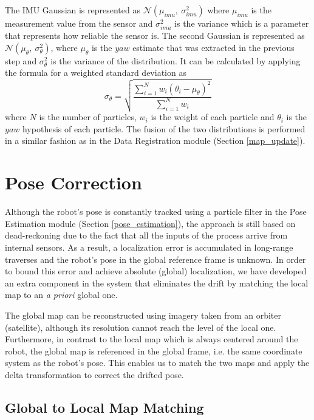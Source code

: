 The IMU Gaussian is represented as $\mathcal{N}(\mu_{imu} ,\ \sigma^2_{imu})$
where $\mu_{imu}$ is the measurement value from the sensor and
$\sigma^2_{imu}$ is the variance which is a parameter that represents how
reliable the sensor is.
The second Gaussian is represented as
$\mathcal{N}(\mu_{\theta} ,\ \sigma^2_{\theta})$,
where $\mu_{\theta}$ is the $yaw$ estimate that was extracted in the
previous step and $\sigma^2_{\theta}$ is the variance of the distribution.
It can be calculated by applying the formula for a weighted standard
deviation as
\begin{equation}
    \sigma_\theta = \sqrt{\frac
    {\sum\limits^{N}_{i=1} w_i (\theta_i - \mu_\theta)^2}
    {\sum\limits^{N}_{i=1} w_i}}
\end{equation}
where
$N$ is the number of particles,
$w_i$ is the weight of each particle and
$\theta_i$ is the $yaw$ hypothesis of each particle.
The fusion of the two distributions is performed in a similar fashion as
in the Data Registration module (Section \ref{map_update}).

\section{Pose Correction}

Although the robot's pose is constantly tracked using a particle filter in the
Pose Estimation module (Section \ref{pose_estimation}), the approach
is still based on dead-reckoning due to the fact that all the inputs
of the process arrive from internal sensors.
As a result, a localization error is accumulated in long-range traverses
and the robot's pose in the global reference frame is unknown.
In order to bound this error and achieve absolute (global) localization,
we have developed an extra component in the system that eliminates
the drift by matching the local map to an \textit{a priori} global one.

The global map can be reconstructed using imagery taken from an
orbiter (satellite), although its resolution cannot reach the level of
the local one.
Furthermore, in contrast to the local map which is always centered around
the robot, the global map is referenced in the global frame, i.e. the
same coordinate system as the robot's pose.
This enables us to match the two maps and apply the delta transformation
to correct the drifted pose.

\subsection{Global to Local Map Matching} \label{map_matching}

